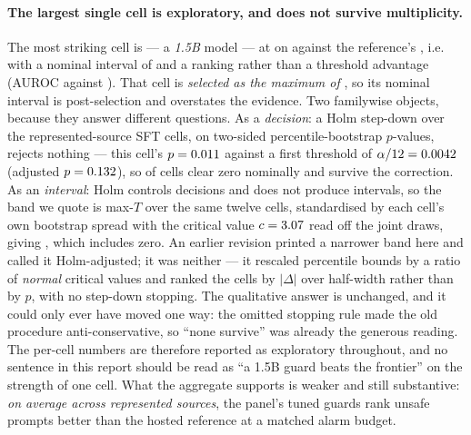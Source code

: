 \documentclass[11pt]{article}
\begin{document}
\paragraph{The largest single cell is exploratory, and does not survive multiplicity.} The most
striking cell is \HtwoBestName{} --- a \emph{1.5B} model --- at \HtwoBestTpr{} on
\HtwoBestSource{} against the reference's \HtwoRefTpr, i.e.\ \HtwoBestDeltaTpr{} with a
nominal interval of \HtwoBestDeltaTprCI{} and a ranking rather than a threshold advantage
(AUROC \HtwoBestAuroc{} against \HtwoRefAuroc). That cell is \emph{selected as the maximum of
\HtwoNCells{}}, so its nominal interval is post-selection and overstates the evidence. Two
familywise objects, because they answer different questions. As a \emph{decision}: a Holm
step-down over the \HtwoNCells{} represented-source SFT cells, on two-sided percentile-bootstrap
$p$-values, rejects nothing --- this cell's $p=0.011$ against a first threshold of
$\alpha/12=0.0042$ (adjusted $p=0.132$), so \HtwoNSigNominal{} of
\HtwoNCells{} cells clear zero nominally and \HtwoNSigHolm{} survive the correction. As an
\emph{interval}: Holm controls decisions and does not produce intervals, so the band we quote is
max-$T$ over the same twelve cells, standardised by each cell's own bootstrap spread with the
critical value $c=3.07$ read off the joint draws, giving \HtwoBestDeltaTprHolm{}, which
includes zero. An earlier revision printed a narrower band here and called it Holm-adjusted; it
was neither --- it rescaled percentile bounds by a ratio of \emph{normal} critical values and
ranked the cells by $|\Delta|$ over half-width rather than by $p$, with no step-down stopping.
The qualitative answer is unchanged, and it could only ever have moved one way: the omitted
stopping rule made the old procedure anti-conservative, so ``none survive'' was already the
generous reading. The per-cell numbers are
therefore reported as exploratory throughout, and no sentence in this report should be read as
``a 1.5B guard beats the frontier'' on the strength of one cell. What the aggregate supports is
weaker and still substantive: \emph{on average across represented sources}, the panel's tuned
guards rank unsafe prompts better than the hosted reference at a matched alarm budget.
\end{document}
